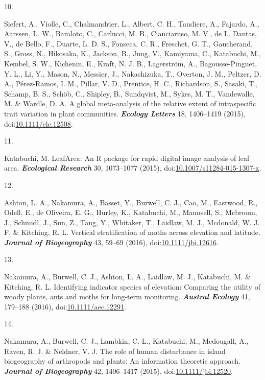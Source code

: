\documentclass[
]{article}
\newlength{\cslhangindent}
\newlength{\csllabelwidth}
\newlength{\cslentryspacingunit} %
\newenvironment{CSLReferences}[2] %
 {%
  \setlength{\parindent}{0pt}
  \ifodd #1
  \let\oldpar\par
  \def\par{\hangindent=\cslhangindent\oldpar}
  \fi
  \setlength{\parskip}{#2\cslentryspacingunit}
 }%
 {}
\newcommand{\CSLLeftMargin}[1]{\parbox[t]{\csllabelwidth}{#1}}
\newcommand{\CSLRightInline}[1]{\parbox[t]{\linewidth - \csllabelwidth}{#1}\break}
\begin{document}
\begin{CSLReferences}{0}{0}
\leavevmode{}%
\CSLLeftMargin{10. }%
\CSLRightInline{Siefert, A., Violle, C., Chalmandrier, L., Albert, C.
H., Taudiere, A., Fajardo, A., Aarssen, L. W., Baraloto, C., Carlucci,
M. B., Cianciaruso, M. V., de L. Dantas, V., de Bello, F., Duarte, L. D.
S., Fonseca, C. R., Freschet, G. T., Gaucherand, S., Gross, N.,
Hikosaka, K., Jackson, B., Jung, V., Kamiyama, C., Katabuchi, M.,
Kembel, S. W., Kichenin, E., Kraft, N. J. B., Lagerström, A.,
Bagousse-Pinguet, Y. L., Li, Y., Mason, N., Messier, J., Nakashizuka,
T., Overton, J. M., Peltzer, D. A., Pérez-Ramos, I. M., Pillar, V. D.,
Prentice, H. C., Richardson, S., Sasaki, T., Schamp, B. S., Schöb, C.,
Shipley, B., Sundqvist, M., Sykes, M. T., Vandewalle, M. \& Wardle, D.
A. A global meta-analysis of the relative extent of intraspecific trait
variation in plant communities. \textbf{\emph{Ecology Letters}} 18,
1406--1419 (2015),
doi:\href{https://doi.org/10.1111/ele.12508}{10.1111/ele.12508}.}

\leavevmode{}%
\CSLLeftMargin{11. }%
\CSLRightInline{Katabuchi, M. {LeafArea}: An {R} package for rapid
digital image analysis of leaf area. \textbf{\emph{Ecological Research}}
30, 1073--1077 (2015),
doi:\href{https://doi.org/10.1007/s11284-015-1307-x}{10.1007/s11284-015-1307-x}.}

\leavevmode{}%
\CSLLeftMargin{12. }%
\CSLRightInline{Ashton, L. A., Nakamura, A., Basset, Y., Burwell, C. J.,
Cao, M., Eastwood, R., Odell, E., de Oliveira, E. G., Hurley, K.,
Katabuchi, M., Maunsell, S., Mcbroom, J., Schmidl, J., Sun, Z., Tang,
Y., Whitaker, T., Laidlaw, M. J., Mcdonald, W. J. F. \& Kitching, R. L.
Vertical stratification of moths across elevation and latitude.
\textbf{\emph{Journal of Biogeography}} 43, 59--69 (2016),
doi:\href{https://doi.org/10.1111/jbi.12616}{10.1111/jbi.12616}.}

\leavevmode{}%
\CSLLeftMargin{13. }%
\CSLRightInline{Nakamura, A., Burwell, C. J., Ashton, L. A., Laidlaw, M.
J., Katabuchi, M. \& Kitching, R. L. Identifying indicator species of
elevation: {Comparing} the utility of woody plants, ants and moths for
long-term monitoring. \textbf{\emph{Austral Ecology}} 41, 179--188
(2016),
doi:\href{https://doi.org/10.1111/aec.12291}{10.1111/aec.12291}.}

\leavevmode{}%
\CSLLeftMargin{14. }%
\CSLRightInline{Nakamura, A., Burwell, C. J., Lambkin, C. L., Katabuchi,
M., Mcdougall, A., Raven, R. J. \& Neldner, V. J. The role of human
disturbance in island biogeography of arthropods and plants: {An}
information theoretic approach. \textbf{\emph{Journal of Biogeography}}
42, 1406--1417 (2015),
doi:\href{https://doi.org/10.1111/jbi.12520}{10.1111/jbi.12520}.}


\end{CSLReferences}
\end{document}
